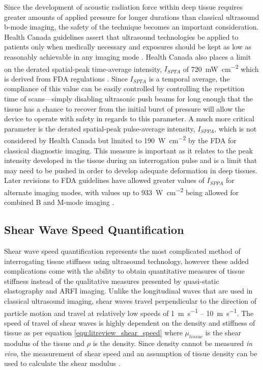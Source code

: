 			Since the development of acoustic radiation force within deep tissue requires greater amounts of applied pressure for longer durations than classical ultrasound b-mode imaging, the safety of the technique becomes an important consideration. Health Canada guidelines assert that ultrasound technologies be applied to patients only when medically necessary and exposures should be kept as low as reasonably achievable in any imaging mode \cite{HealthCanadaUltrasound}. Health Canada also places a limit on the derated spatial-peak time-average intensity, $I_{SPTA}$ of \SI{720}{\mW\per\cm\squared} which is derived from FDA regulations \cite{FDAUltrasoundGuidelines}. Since $I_{SPTA}$ is a temporal average, the compliance of this value can be easily controlled by controlling the repetition time of scans---simply disabling ultrasonic push beams for long enough that the tissue has a chance to recover from the initial burst of pressure will allow the device to operate with safety in regards to this parameter. A much more critical parameter is the derated spatial-peak pulse-average intensity, $I_{SPPA}$, which is not considered by Health Canada but limited to \SI{190}{\W\per\cm\squared} by the FDA \cite{FDAUltrasoundGuidelines} for classical diagnostic imaging. This measure is important as it relates to the peak intensity developed in the tissue during an interrogation pulse and is a limit that may need to be pushed in order to develop adequate deformation in deep tissues. Later revisions to FDA guidelines have allowed greater values of $I_{SPPA}$ for alternate imaging modes, with values up to \SI{933}{\W\per\cm\squared} being allowed for combined B and M-mode imaging \cite{hoskins10}.

		\subsection{Shear Wave Speed Quantification}
			Shear wave speed quantification represents the most complicated method of interrogating tissue stiffness using ultrasound technology, however these added complications come with the ability to obtain quantitative measures of tissue stiffness instead of the qualitative measures presented by quasi-static elastography and ARFI imaging. Unlike the longitudinal waves that are used in classical ultrasound imaging, shear waves travel perpendicular to the direction of particle motion and travel at relatively low speeds of \SI{1}{\m\per\s} -- \SI{10}{\m\per\s}. The speed of travel of shear waves is highly dependent on the density and stiffness of tissue as per equation \ref{equ:litreview_shear_speed} where $\mu_{tissue}$ is the shear modulus of the tissue and $\rho$ is the density. Since density cannot be measured \emph{in vivo}, the measurement of shear speed and an assumption of tissue density can be used to calculate the shear modulus \cite{hoskins10}.

